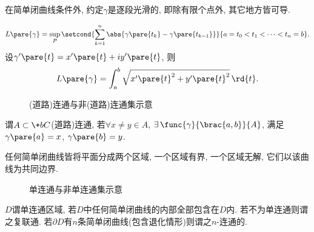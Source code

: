 \documentclass{ctexart}
\begin{document}
\begin{remark}
    在简单闭曲线条件外, 约定$\gamma$是逐段光滑的, 即除有限个点外, 其它地方皆可导.
\end{remark}
\begin{definition}[曲线的长度]
    \[ L\pare{\gamma} = \sup_P \setcond{\sum_{k=1}^n \abs{\gamma\pare{t_k} - \gamma\pare{t_{k-1}}}}{a=t_0 < t_1 < \cdots < t_n = b}. \]
    设$\gamma'\pare{t} = x'\pare{t} + iy'\pare{t}$, 则
    \[ L\pare{\gamma} = \int_a^b \sqrt{x'\pare{t}^2 + y'\pare{t}^2} \,\rd{t}. \]
\end{definition}
\begin{figure}[ht]
    \centering
    \caption{(道路)连通与非(道路)连通集示意}
\end{figure}
\begin{definition}[连通]
    谓$A\subset \+bC$(道路)连通, 若$\forall x\neq y\in A$, $\exists\, \func{\gamma}{\brac{a,b}}{A}$, 满足$\gamma\pare{a} = x$, $\gamma\pare{b} = y$.
\end{definition}
\begin{theorem}[Jordan曲线定理]
    任何简单闭曲线皆将平面分成两个区域, 一个区域有界, 一个区域无解, 它们以该曲线为共同边界.
\end{theorem}
\begin{figure}[ht]
    \centering
    \caption{单连通与非单连通集示意}
\end{figure}
\begin{definition}[单连通]
    $D$谓单连通区域, 若$D$中任何简单闭曲线的内部全部包含在$D$内. 若不为单连通则谓之复联通. 若$\partial D$有$n$条简单闭曲线(包含退化情形)则谓之$n$-连通的.
\end{definition}



\end{document}
